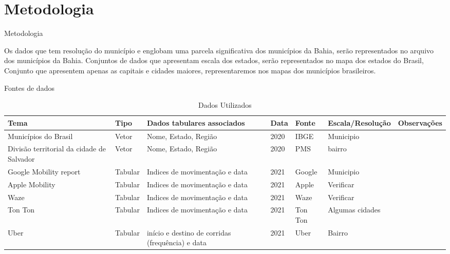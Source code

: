 \documentclass[10pt]{beamer}
\begin{document}
\section{Metodologia}

\begin{frame}{Metodologia}

  Os dados que tem resolução do município e englobam uma parcela significativa dos municípios da Bahia, serão representados no arquivo dos municípios da Bahia. Conjuntos de dados que apresentam escala dos estados, serão representados no mapa dos estados do Brasil, Conjunto que apresentem apenas as capitais e cidades maiores, representaremos nos mapas dos municípios brasileiros.

\end{frame}

\begin{frame}{Fontes de dados}

  \begin{table}[]
    \centering
    \caption{Dados Utilizados}
    \label{tabel:tab01}
    \begin{adjustbox}{width=\textwidth}
  
    \begin{tabular}{|p{3cm}|p{1cm}|p{3cm}|p{1cm}|p{1cm}|p{2.5cm}|p{3cm}|}
    \hline
    Tema                   & Tipo    & Dados tabulares \newline associados     & Data & Fonte  & Escala/Resolução & Observações \\ \hline
    Municípios do Brasil   & Vetor   & Nome, Estado, Região           & 2020 & IBGE   & Municipio        &             \\ \hline
    Divisão territorial da cidade de Salvador   & Vetor   & Nome, Estado, Região           & 2020 & PMS   & bairro        &             \\ \hline
    Google Mobility report & Tabular & Indices de movimentação e data & 2021 & Google & Municipio        &             \\ \hline
    Apple Mobility		   & Tabular & Indices de movimentação e data & 2021 &  Apple & Verificar        &             \\ \hline
    Waze         		   & Tabular & Indices de movimentação e data & 2021 &  Waze  & Verificar        &             \\ \hline
    Ton Ton        		   & Tabular & Indices de movimentação e data & 2021 &  Ton Ton & Algumas cidades&             \\ \hline
    Uber        		   & Tabular & início e destino de corridas (frequência) e data & 2021 &  Uber &  Bairro &             \\ \hline
  
    \end{tabular}
      \end{adjustbox}
    \end{table}
 

\end{frame}
\end{document}
